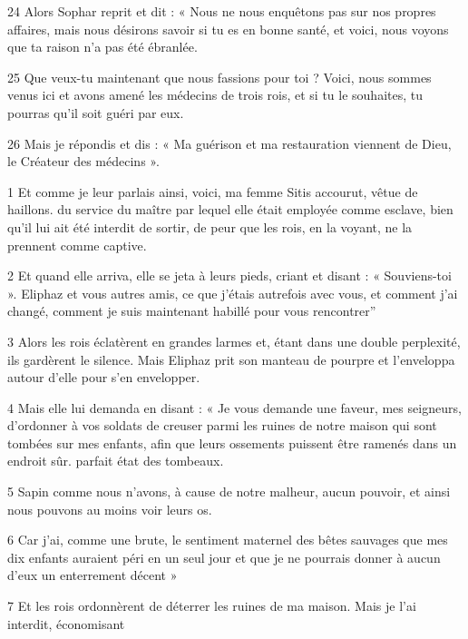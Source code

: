 \par 24 Alors Sophar reprit et dit : « Nous ne nous enquêtons pas sur nos propres affaires, mais nous désirons savoir si tu es en bonne santé, et voici, nous voyons que ta raison n'a pas été ébranlée.

\par 25 Que veux-tu maintenant que nous fassions pour toi ? Voici, nous sommes venus ici et avons amené les médecins de trois rois, et si tu le souhaites, tu pourras qu'il soit guéri par eux.

\par 26 Mais je répondis et dis : « Ma guérison et ma restauration viennent de Dieu, le Créateur des médecins ».


\par 1 Et comme je leur parlais ainsi, voici, ma femme Sitis accourut, vêtue de haillons. du service du maître par lequel elle était employée comme esclave, bien qu'il lui ait été interdit de sortir, de peur que les rois, en la voyant, ne la prennent comme captive.

\par 2 Et quand elle arriva, elle se jeta à leurs pieds, criant et disant : « Souviens-toi ». Eliphaz et vous autres amis, ce que j'étais autrefois avec vous, et comment j'ai changé, comment je suis maintenant habillé pour vous rencontrer''

\par 3 Alors les rois éclatèrent en grandes larmes et, étant dans une double perplexité, ils gardèrent le silence. Mais Eliphaz prit son manteau de pourpre et l'enveloppa autour d'elle pour s'en envelopper.

\par 4 Mais elle lui demanda en disant : « Je vous demande une faveur, mes seigneurs, d'ordonner à vos soldats de creuser parmi les ruines de notre maison qui sont tombées sur mes enfants, afin que leurs ossements puissent être ramenés dans un endroit sûr. parfait état des tombeaux.

\par 5 Sapin comme nous n'avons, à cause de notre malheur, aucun pouvoir, et ainsi nous pouvons au moins voir leurs os.

\par 6 Car j'ai, comme une brute, le sentiment maternel des bêtes sauvages que mes dix enfants auraient péri en un seul jour et que je ne pourrais donner à aucun d'eux un enterrement décent »

\par 7 Et les rois ordonnèrent de déterrer les ruines de ma maison. Mais je l'ai interdit, économisant

